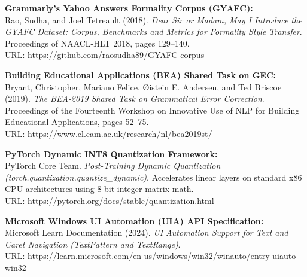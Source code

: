 \documentclass[11pt,a4paper]{article}
\begin{document}
\begin{enumerate}[label={[\arabic*]}, leftmargin=2em, itemsep=0.6em]
    \item \textbf{Grammarly's Yahoo Answers Formality Corpus (GYAFC):} \\
    Rao, Sudha, and Joel Tetreault (2018). \textit{Dear Sir or Madam, May I Introduce the GYAFC Dataset: Corpus, Benchmarks and Metrics for Formality Style Transfer}. Proceedings of NAACL-HLT 2018, pages 129--140. \\
    URL: \url{https://github.com/raosudha89/GYAFC-corpus}

    \item \textbf{Building Educational Applications (BEA) Shared Task on GEC:} \\
    Bryant, Christopher, Mariano Felice, {\O}istein E. Andersen, and Ted Briscoe (2019). \textit{The BEA-2019 Shared Task on Grammatical Error Correction}. Proceedings of the Fourteenth Workshop on Innovative Use of NLP for Building Educational Applications, pages 52--75. \\
    URL: \url{https://www.cl.cam.ac.uk/research/nl/bea2019st/}

    \item \textbf{PyTorch Dynamic INT8 Quantization Framework:} \\
    PyTorch Core Team. \textit{Post-Training Dynamic Quantization (torch.quantization.quantize\_dynamic)}. Accelerates linear layers on standard x86 CPU architectures using 8-bit integer matrix math. \\
    URL: \url{https://pytorch.org/docs/stable/quantization.html}

    \item \textbf{Microsoft Windows UI Automation (UIA) API Specification:} \\
    Microsoft Learn Documentation (2024). \textit{UI Automation Support for Text and Caret Navigation (TextPattern and TextRange)}. \\
    URL: \url{https://learn.microsoft.com/en-us/windows/win32/winauto/entry-uiauto-win32}
\end{enumerate}
\end{document}
